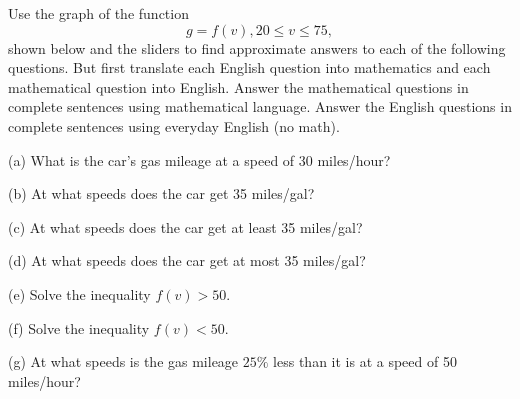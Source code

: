 \documentclass{ximera}
\begin{document}
\begin{example}  \label{ExFun35}
Use the graph of the function 
\[
    g = f(v) , 20\leq v \leq 75 ,
\]
shown below and the sliders to find approximate answers to each of the following questions. But first translate each English question into mathematics and each mathematical question into English. Answer the mathematical questions in complete sentences using mathematical language. Answer the English questions in complete sentences using everyday English (no math). 

(a) What is the car's gas mileage at a speed of 30 miles/hour?

(b) At what speeds does the car get 35 miles/gal?

(c)  At what speeds does the car get at least 35 miles/gal?

(d)  At what speeds does the car get at most 35 miles/gal?

(e) Solve the inequality $f(v)> 50$.

(f) Solve the inequality $f(v)<50$.

(g) At what speeds is the gas mileage $25\%$ less than it is at a speed of 50 miles/hour?

 
\begin{onlineOnly}
    \begin{center}
\end{center}
\end{onlineOnly}
\end{example}
\end{document}

